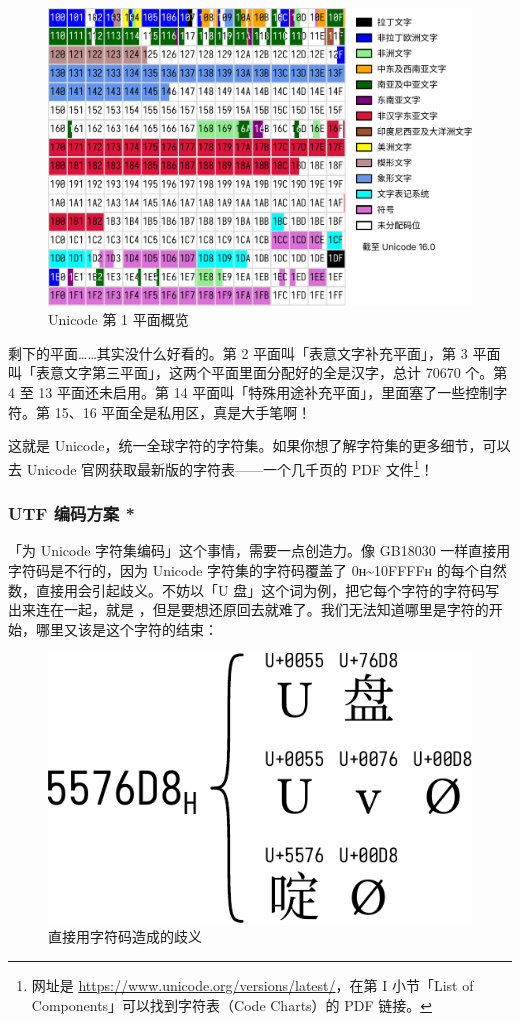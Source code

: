 \begin{figure}[htb!]
  \centering
  \includegraphics[width=.7\textwidth]{assets/advanced/UnicodeSMP.pdf}
  \caption{Unicode 第 1 平面概览}
  \label{fig:UnicodeSMP}
\end{figure}

剩下的平面……其实没什么好看的。第 2 平面叫「表意文字补充平面」，第 3 平面叫「表意文字第三平面」，这两个平面里面分配好的全是汉字，总计 70670 个。第 4 至 13 平面还未启用。第 14 平面叫「特殊用途补充平面」，里面塞了一些控制字符。第 15、16 平面全是私用区，真是大手笔啊！

这就是 Unicode，统一全球字符的字符集。如果你想了解字符集的更多细节，可以去 Unicode 官网获取最新版的字符表——一个几千页的 PDF 文件\footnote{网址是 \url{https://www.unicode.org/versions/latest/}，在第 I 小节「List of Components」可以找到字符表（Code Charts）的 PDF 链接。}！

\subsubsection{UTF 编码方案 *}

「为 Unicode 字符集编码」这个事情，需要一点创造力。像 GB18030 一样直接用字符码是不行的，因为 Unicode 字符集的字符码覆盖了 0ʜ\textasciitilde10FFFFʜ 的每个自然数，直接用会引起歧义。不妨以「U 盘」这个词为例，把它每个字符的字符码写出来连在一起，就是 ，但是要想还原回去就难了。我们无法知道哪里是字符的开始，哪里又该是这个字符的结束：

\begin{figure}[htb!]
  \centering
  \includegraphics[width=.5\textwidth]{assets/advanced/UnicodeEncoding.pdf}
  \caption{直接用字符码造成的歧义}
  \label{fig:UnicodeEncoding}
\end{figure}

